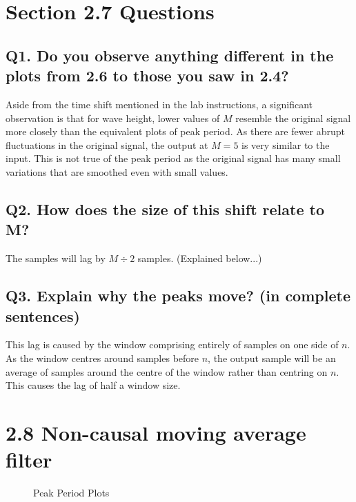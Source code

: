 \documentclass[titlepage]{scrartcl}
\begin{document}
    \section*{Section 2.7 Questions}
    \subsection*{Q1. Do you observe anything different in the plots from 2.6 to those you saw in 2.4?}
    Aside from the time shift mentioned in the lab instructions, a significant
    observation is that for wave height, lower values of $M$ resemble the
    original signal more closely than the equivalent plots of peak period. As
    there are fewer abrupt fluctuations in the original signal, the output at
    $M=5$ is very similar to the input. This is not true of the peak period as
    the original signal has many small variations that are smoothed even with
    small values.

    \subsection*{Q2. How does the size of this shift relate to M?}
    The samples will lag by $M\div2$ samples. (Explained below...)

    \subsection*{Q3. Explain why the peaks move? (in complete sentences)}
    This lag is caused by the window comprising entirely of samples on one side
    of $n$. As the window centres around samples before $n$, the output sample
    will be an average of samples around the centre of the window rather than
    centring on $n$. This causes the lag of half a window size.

    \section*{2.8 Non-causal moving average filter}

    \begin{figure}[H]
        \caption{Peak Period Plots}
    \end{figure}
    
\end{document}
